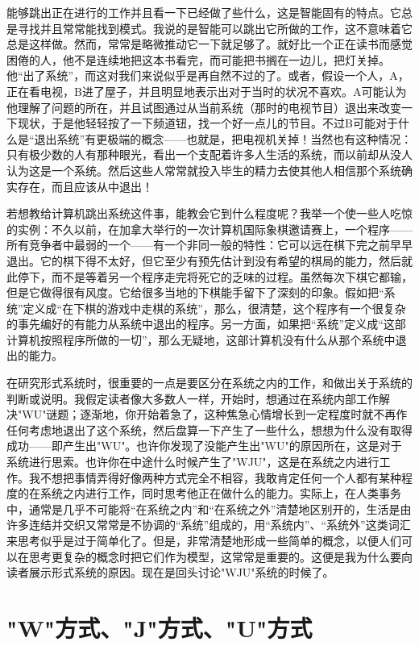 能够跳出正在进行的工作并且看一下已经做了些什么，这是智能固有的特点。它总是寻找并且常常能找到模式。我说的是智能可以跳出它所做的工作，这不意味着它总是这样做。然而，常常是略微推动它一下就足够了。就好比一个正在读书而感觉困倦的人，他不是连续地把这本书看完，而可能把书搁在一边儿，把灯关掉。他“出了系统”，而这对我们来说似乎是再自然不过的了。或者，假设一个人，A，正在看电视，B进了屋子，并且明显地表示出对于当时的状况不喜欢。A可能认为他理解了问题的所在，并且试图通过从当前系统（那时的电视节目）退出来改变一下现状，于是他轻轻按了一下频道钮，找一个好一点儿的节目。不过B可能对于什么是“退出系统”有更极端的概念——也就是，把电视机关掉！当然也有这种情况：只有极少数的人有那种眼光，看出一个支配着许多人生活的系统，而以前却从没人认为这是一个系统。然后这些人常常就投入毕生的精力去使其他人相信那个系统确实存在，而且应该从中退出！

若想教给计算机跳出系统这件事，能教会它到什么程度呢？我举一个使一些人吃惊的实例：不久以前，在加拿大举行的一次计算机国际象棋邀请赛上，一个程序——所有竞争者中最弱的一个——有一个非同一般的特性：它可以远在棋下完之前早早退出。它的棋下得不太好，但它至少有预先估计到没有希望的棋局的能力，然后就此停下，而不是等着另一个程序走完将死它的乏味的过程。虽然每次下棋它都输，但是它做得很有风度。它给很多当地的下棋能手留下了深刻的印象。假如把“系统”定义成“在下棋的游戏中走棋的系统”，那么，很清楚，这个程序有一个很复杂的事先编好的有能力从系统中退出的程序。另一方面，如果把“系统”定义成“这部计算机按照程序所做的一切”，那么无疑地，这部计算机没有什么从那个系统中退出的能力。

在研究形式系统时，很重要的一点是要区分在系统之内的工作，和做出关于系统的判断或说明。我假定读者像大多数人一样，开始时，想通过在系统内部工作解决"WU"谜题；逐渐地，你开始着急了，这种焦急心情增长到一定程度时就不再作任何考虑地退出了这个系统，然后盘算一下产生了一些什么，想想为什么没有取得成功——即产生出"WU"。也许你发现了没能产生出"WU"的原因所在，这是对于系统进行思索。也许你在中途什么时候产生了"WJU"，这是在系统之内进行工作。我不想把事情弄得好像两种方式完全不相容，我敢肯定任何一个人都有某种程度的在系统之内进行工作，同时思考他正在做什么的能力。实际上，在人类事务中，通常是几乎不可能将“在系统之内”和“在系统之外”清楚地区别开的，生活是由许多连结并交织又常常是不协调的“系统”组成的，用“系统内”、“系统外”这类词汇来思考似乎是过于简单化了。但是，非常清楚地形成一些简单的概念，以便人们可以在思考更复杂的概念时把它们作为模型，这常常是重要的。这便是我为什么要向读者展示形式系统的原因。现在是回头讨论"WJU"系统的时候了。

\section{"W"方式、"J"方式、"U"方式}

